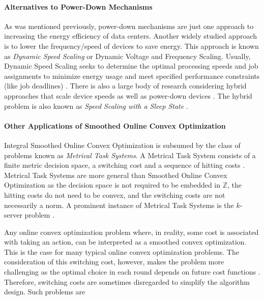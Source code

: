\paragraph{Alternatives to Power-Down Mechanisms} As was mentioned previously, power-down mechanisms are just one approach to increasing the energy efficiency of data centers. Another widely studied approach is to lower the frequency/speed of devices to save energy. This approach is known as \textit{Dynamic Speed Scaling} or Dynamic Voltage and Frequency Scaling. Usually, Dynamic Speed Scaling seeks to determine the optimal processing speeds and job assignments to minimize energy usage and meet specified performance constraints (like job deadlines) \cite{Albers2007, Albers2011, Jin2016}. There is also a large body of research considering hybrid approaches that scale device speeds as well as power-down devices \cite{Jin2016}. The hybrid problem is also known as \textit{Speed Scaling with a Sleep State} \cite{Albers2014}.

\paragraph{Other Applications of Smoothed Online Convex Optimization} Integral Smoothed Online Convex Optimization is subsumed by the class of problems known as \textit{Metrical Task Systems}. A Metrical Task System consists of a finite metric decision space, a switching cost and a sequence of hitting costs \cite{Bubeck2018_3}. Metrical Task Systems are more general than Smoothed Online Convex Optimization as the decision space is not required to be embedded in $\mathbb{Z}$, the hitting costs do not need to be convex, and the switching costs are not necessarily a norm. A prominent instance of Metrical Task Systems is the $k$-server problem \cite{Bubeck2017}.

Any online convex optimization problem where, in reality, some cost is associated with taking an action, can be interpreted as a smoothed convex optimization. This is the case for many typical online convex optimization problems. The consideration of this switching cost, however, makes the problem more challenging as the optimal choice in each round depends on future cost functions \cite{Chen2015}. Therefore, switching costs are sometimes disregarded to simplify the algorithm design. Such problems are

